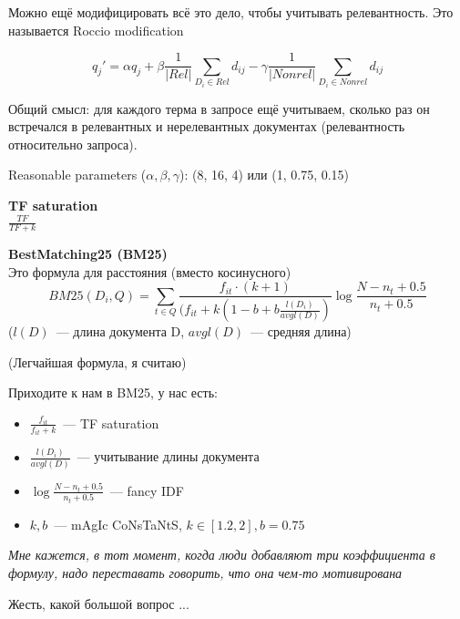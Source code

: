 \documentclass[12pt]{article}
\begin{document}
    Можно ещё модифицировать всё это дело, чтобы учитывать релевантность. Это называется Roccio modification

    $$q_j' = \alpha  q_j + \beta \frac{1}{|Rel|} \sum\limits_{D_i \in Rel} d_{ij} - \gamma \frac{1}{|Nonrel|} \sum\limits_{D_i \in Nonrel} d_{ij}$$

    Общий смысл: для каждого терма в запросе ещё учитываем, сколько раз он встречался в релевантных и нерелевантных документах (релевантность относительно запроса).

    Reasonable parameters ($\alpha, \beta, \gamma$): (8, 16, 4) или (1, 0.75, 0.15)

    \smallskip\smallskip
    {\bf TF saturation}\\
    $\frac{TF}{TF + k}$

    \smallskip\smallskip
    {\bf BestMatching25 (BM25)}\\
    Это формула для расстояния (вместо косинусного)
     $$ BM25(D_i, Q) = \sum\limits_{t \in Q} \frac{f_{it} \cdot (k + 1)}{(f_{it} + k (1 - b + b \frac{l(D_i)}{avgl(D)})} \log \frac{N - n_t + 0.5}{n_t + 0.5}$$
     ($l(D)$~--- длина документа D, $avgl(D)$~--- средняя длина)

     (Легчайшая формула, я считаю)

     \smallskip\smallskip
     Приходите к нам в BM25, у нас есть:
      \begin{itemize}
        \item $\frac{f_{it}}{f_{it} + k}$~--- TF saturation
        \item $\frac{l(D_i)}{avgl(D)}$~--- учитывание длины документа
        \item $\log \frac{N - n_t + 0.5}{n_t + 0.5}$~--- fancy IDF
        \item $k, b$~--- mAgIc CoNsTaNtS, $k \in [1.2, 2], b = 0.75$
      \end{itemize}

    \smallskip\smallskip
    \textit{Мне кажется, в тот момент, когда люди добавляют три коэффициента в формулу, надо переставать говорить, что она чем-то мотивирована}

    Жесть, какой большой вопрос ...




\pagebreak %

\section{} %
\end{document}
